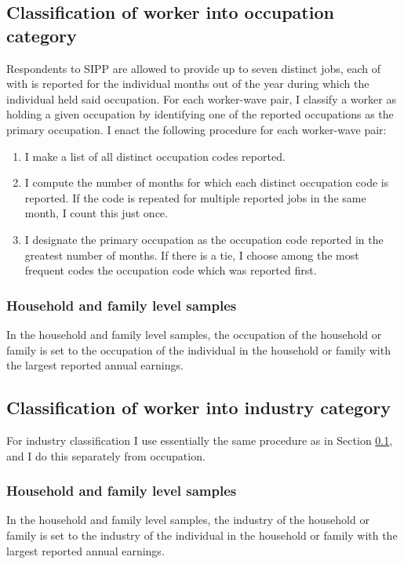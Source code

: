 \documentclass{article}
\begin{document}
\subsection{Classification of worker into occupation category}
\label{sipp_occupation}
Respondents to SIPP are allowed to provide up to seven distinct jobs, each of with is reported for the individual months out of the year during which the individual held said occupation.
For each worker-wave pair, I classify a worker as holding a given occupation by identifying one of the reported occupations as the primary occupation. I enact the following procedure for each worker-wave pair:
\begin{enumerate}
\item I make a list of all distinct occupation codes reported.
\item I compute the number of months for which each distinct occupation code is reported. If the code is repeated for multiple reported jobs in the same month, I count this just once.
\item I designate the primary occupation as the occupation code reported in the greatest number of months. If there is a tie, I choose among the most frequent codes the occupation code which was reported first.
\end{enumerate}

\subsubsection{Household and family level samples}
In the household and family level samples, the occupation of the household or family is set to the occupation of the individual in the household or family with the largest reported annual earnings.

\subsection{Classification of worker into industry category}
For industry classification I use essentially the same procedure as in Section \ref{sipp_occupation}, and I do this separately from occupation.

\subsubsection{Household and family level samples}
In the household and family level samples, the industry of the household or family is set to the industry of the individual in the household or family with the largest reported annual earnings.
\end{document}

